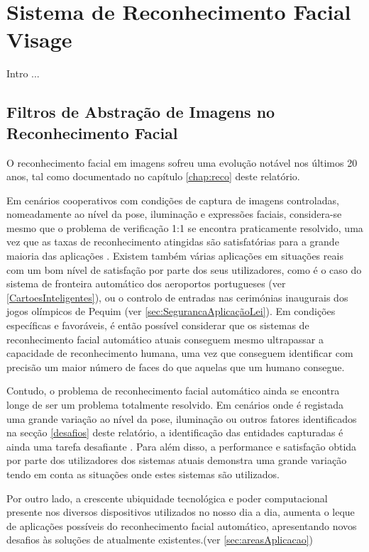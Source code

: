 \chapter{Sistema de Reconhecimento Facial Visage} \label{chap:visage}

Intro ...


\section{Filtros de Abstração de Imagens no Reconhecimento Facial}
O reconhecimento facial em imagens sofreu uma evolução notável nos últimos 20 anos, tal como documentado no capítulo \ref{chap:reco} deste relatório. 

Em cenários cooperativos com condições de captura de imagens controladas, nomeadamente ao nível da pose, iluminação e expressões faciais, considera-se mesmo que o problema de verificação 1:1 se encontra praticamente resolvido, uma vez que as taxas de reconhecimento atingidas são satisfatórias para a grande maioria das aplicações \cite{Li2011}. Existem também várias aplicações em situações reais com um bom nível de satisfação por parte dos seus utilizadores, como é o caso do sistema de fronteira automático dos aeroportos portugueses (ver \ref{CartoesInteligentes}), ou o controlo de entradas nas cerimónias inaugurais dos jogos olímpicos de Pequim (ver \ref{sec:SegurancaAplicaçãoLei}). Em condições específicas e favoráveis, é então possível considerar que os sistemas de reconhecimento facial automático atuais conseguem mesmo ultrapassar a capacidade de reconhecimento humana, uma vez que conseguem identificar com precisão um maior número de faces do que aquelas que um humano consegue.

Contudo, o problema de reconhecimento facial automático ainda se encontra longe de ser um problema totalmente resolvido. Em cenários onde é registada uma grande variação ao nível da pose, iluminação ou outros fatores identificados na secção \ref{desafios} deste relatório, a identificação das entidades capturadas é ainda uma tarefa desafiante  \cite{Li2011}. Para além disso, a performance e satisfação obtida por parte dos utilizadores dos sistemas atuais demonstra uma grande variação tendo em conta as situações onde estes sistemas são utilizados. 

Por outro lado, a crescente ubiquidade tecnológica e poder computacional presente nos diversos dispositivos utilizados no nosso dia a dia, aumenta o leque de aplicações possíveis do reconhecimento facial automático, apresentando novos desafios às soluções de atualmente existentes.(ver \ref{sec:areasAplicacao})

